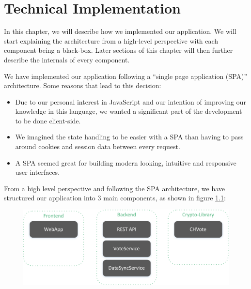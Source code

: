 \chapter{Technical Implementation}
In this chapter, we will describe how we implemented our application. We will start explaining the architecture from a high-level perspective with each component being a black-box. Later sections of this chapter will then further describe the internals of every component.

We have implemented our application following a "`single page application (SPA)"' architecture. Some reasons that lead to this decision:
\begin{itemize}
	\item Due to our personal interest in JavaScript and our intention of improving our knowledge in this language, we wanted a significant part of the development to be done client-side.
	\item We imagined the state handling to be easier with a SPA than having to pass around cookies and session data between every request.
	\item A SPA seemed great for building modern looking, intuitive and responsive user interfaces.
\end{itemize}

From a high level perspective and following the SPA architecture, we have structured our application into 3 main components, as shown in figure \ref{System components}:

\begin{figure}[h!]
\begin{center}
\includegraphics[scale=0.95]{assets/componentdiagram.pdf}
\label{System components}
\end{center}
\end{figure}

